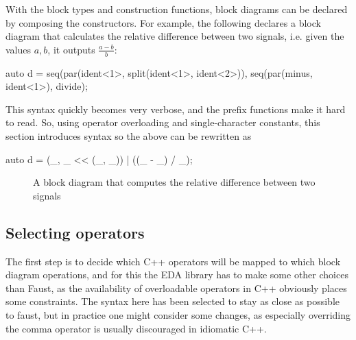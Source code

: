With the block types and construction functions, block diagrams can be declared by composing the
constructors. For example, the following declares a block diagram that calculates the relative difference
between two signals, i.e. given the values $a, b$, it outputs $\frac{a - b}{b}$:

\begin{cppcodenl}
  auto d = seq(par(ident<1>, split(ident<1>, ident<2>)), seq(par(minus, ident<1>), divide);
\end{cppcodenl}

This syntax quickly becomes very verbose, and the prefix functions make it hard to read. So, using operator
overloading and single-character constants, this section introduces syntax so the above can be rewritten as

\begin{cppcodenl}
  auto d = (_, _ << (_, _)) | ((_ - _) / _);
\end{cppcodenl}

\begin{figure}
  \centering
  
  \caption{A block diagram that computes the relative difference between two signals}
  \label{fig:block_reldiff}
\end{figure}

\subsection{Selecting operators}

\newcommand{\oper}[1]{\EscVerb{#1}}

The first step is to decide which C++ operators will be mapped to which block diagram operations, and for
this the EDA library has to make some other choices than Faust, as the availability of overloadable operators
in C++ obviously places some constraints. The syntax here has been selected to stay as close as possible to
faust, but in practice one might consider some changes, as especially overriding the comma operator is
usually discouraged in idiomatic C++.

